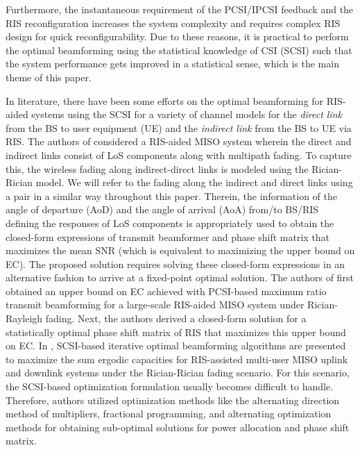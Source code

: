 \documentclass[journal,draftclsnofoot,onecolumn,12pt]{IEEEtran}
\begin{document}
Furthermore, the instantaneous requirement of the PCSI/IPCSI feedback and the RIS reconfiguration increases the system complexity and requires complex RIS design for quick reconfigurability. Due to these reasons, it is practical to perform the optimal beamforming 
using the  statistical knowledge of CSI (SCSI) such that the system performance gets improved in a statistical sense, which is the main theme of this paper. 

In literature, there have been some efforts on the optimal beamforming for RIS-aided systems using the SCSI for a variety of channel models for the {\em direct link} from the BS to user equipment (UE)  and the {\em indirect link} from the BS to UE via RIS.  
The authors of \cite{hu2020statistical} considered a RIS-aided MISO system wherein the direct and indirect links  consist of LoS components along with multipath fading. To capture this, the wireless fading along indirect-direct links is modeled using  the Rician-Rician model.  We will refer to the fading along the indirect and direct links using a pair in a similar way throughout this paper.
Therein, the information of the angle of departure (AoD) and the angle of arrival (AoA) from/to BS/RIS defining the responses of LoS components  is appropriately used to obtain the  closed-form expressions of transmit beamformer and phase shift matrix that maximizes the mean SNR (which is equivalent to maximizing the upper bound on EC). The proposed solution requires  solving these closed-form expressions in an alternative fashion to arrive at a fixed-point optimal solution. The authors of \cite{HanYu_2019_SCSI} first obtained an upper bound on EC achieved with PCSI-based maximum ratio transmit beamforming for a large-scale RIS-aided MISO system under Rician-Rayleigh fading. Next, the authors derived a closed-form solution for a statistically optimal phase shift matrix of RIS that maximizes this upper bound on EC. In \cite{GanXu_2021_SCSI}, SCSI-based iterative optimal beamforming algorithms are presented to maximize the sum ergodic capacities for RIS-assisted multi-user MISO uplink and downlink  systems under the Rician-Rician fading scenario. For this scenario, the SCSI-based optimization formulation usually becomes difficult to handle.  Therefore, authors utilized  optimization methods like the alternating direction method of multipliers, fractional programming, and alternating optimization methods for obtaining sub-optimal solutions for power allocation and phase shift matrix.
\end{document}
